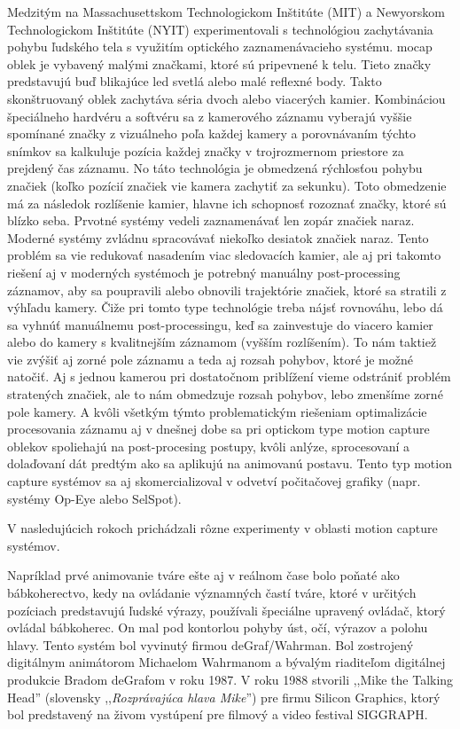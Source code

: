 Medzitým na Massachusettskom Technologickom Inštitúte (MIT) a Newyorskom Technologickom Inštitúte (NYIT) experimentovali s technológiou zachytávania pohybu ľudského tela s využitím optického zaznamenávacieho systému. \acrlong{mocap} oblek je vybavený malými značkami, ktoré sú pripevnené k telu. Tieto značky predstavujú buď blikajúce \acrshort{led} svetlá alebo malé reflexné body. Takto skonštruovaný oblek zachytáva séria dvoch alebo viacerých kamier. Kombináciou špeciálneho hardvéru a softvéru sa z kamerového záznamu vyberajú vyššie spomínané značky z vizuálneho poľa každej kamery a porovnávaním týchto snímkov sa kalkuluje pozícia každej značky v trojrozmernom priestore za prejdený čas záznamu.
No táto technológia je obmedzená rýchlosťou pohybu značiek (koľko pozícií značiek vie kamera zachytiť za sekunku). Toto obmedzenie má za následok rozlíšenie kamier, hlavne ich schopnosť rozoznať značky, ktoré sú blízko seba. Prvotné systémy vedeli zaznamenávať len zopár značiek naraz. Moderné systémy zvládnu spracovávať niekoľko desiatok značiek naraz. Tento problém sa vie redukovať nasadením viac sledovacích kamier, ale aj pri takomto riešení aj v moderných systémoch je potrebný manuálny post-processing záznamov, aby sa poupravili alebo obnovili trajektórie značiek, ktoré sa stratili z výhľadu kamery. Čiže pri tomto type technológie treba nájsť rovnováhu, lebo dá sa vyhnúť manuálnemu post-processingu, keď sa zainvestuje do viacero kamier alebo do kamery s kvalitnejším záznamom (vyšším rozlíšením). To nám taktiež vie zvýšiť aj zorné pole záznamu a teda aj rozsah pohybov, ktoré je možné natočiť. Aj s jednou kamerou pri dostatočnom priblížení vieme odstrániť problém stratených značiek, ale to nám obmedzuje rozsah pohybov, lebo zmenšíme zorné pole kamery. A kvôli všetkým týmto problematickým riešeniam optimalizácie procesovania záznamu aj v dnešnej dobe sa pri optickom type motion capture oblekov spoliehajú na post-procesing postupy, kvôli anlýze, sprocesovaní a dolaďovaní dát predtým ako sa aplikujú na animovanú postavu.
Tento typ motion capture systémov sa aj skomercializoval v odvetví počitačovej grafiky (napr. systémy Op-Eye alebo SelSpot).

V nasledujúcich rokoch prichádzali rôzne experimenty v oblasti motion capture systémov. 

Napríklad prvé animovanie tváre ešte aj v reálnom čase bolo poňaté ako bábkoherectvo, kedy na ovládanie významných častí tváre, ktoré v určitých pozíciach predstavujú ľudské výrazy, používali špeciálne upravený ovládač, ktorý ovládal bábkoherec. On mal pod kontorlou pohyby úst, očí, výrazov a polohu hlavy. Tento systém bol vyvinutý firmou deGraf/Wahrman. Bol zostrojený digitálnym animátorom Michaelom Wahrmanom a bývalým riaditeľom digitálnej produkcie Bradom deGrafom v roku 1987. V roku 1988 stvorili ,,Mike the Talking Head'' (slovensky ,,\textit{Rozprávajúca hlava Mike}'') pre firmu Silicon Graphics, ktorý bol predstavený na živom vystúpení pre filmový a video festival SIGGRAPH.

